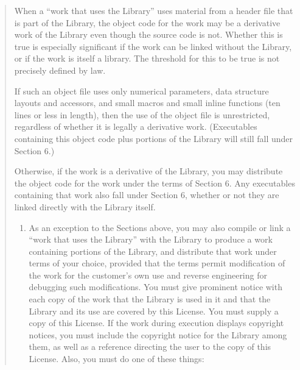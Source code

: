 \documentclass[
]{book}
\providecommand{\tightlist}{%
  \setlength{\itemsep}{0pt}\setlength{\parskip}{0pt}}
\theoremstyle{definition}
\theoremstyle{definition}
\theoremstyle{definition}
\theoremstyle{definition}
\theoremstyle{remark}
\begin{document}
\begin{quote}
When a ``work that uses the Library'' uses material from a header
file that is part of the Library, the object code for the work
may be a derivative work of the Library even though the source
code is not. Whether this is true is especially significant if
the work can be linked without the Library, or if the work is
itself a library. The threshold for this to be true is not
precisely defined by law.

If such an object file uses only numerical parameters, data
structure layouts and accessors, and small macros and small
inline functions (ten lines or less in length), then the use of
the object file is unrestricted, regardless of whether it is
legally a derivative work. (Executables containing this object
code plus portions of the Library will still fall under Section
6.)

Otherwise, if the work is a derivative of the Library, you may
distribute the object code for the work under the terms of
Section 6. Any executables containing that work also fall under
Section 6, whether or not they are linked directly with the
Library itself.

\begin{enumerate}
\def\labelenumi{\arabic{enumi}.}
\setcounter{enumi}{5}
\tightlist
\item
  As an exception to the Sections above, you may also compile
  or link a ``work that uses the Library'' with the Library to
  produce a work containing portions of the Library, and
  distribute that work under terms of your choice, provided that
  the terms permit modification of the work for the customer's own
  use and reverse engineering for debugging such modifications.
  You must give prominent notice with each copy of the work that
  the Library is used in it and that the Library and its use are
  covered by this License. You must supply a copy of this
  License. If the work during execution displays copyright
  notices, you must include the copyright notice for the Library
  among them, as well as a reference directing the user to the
  copy of this License. Also, you must do one of these things:
\end{enumerate}


\end{quote}
\end{document}

